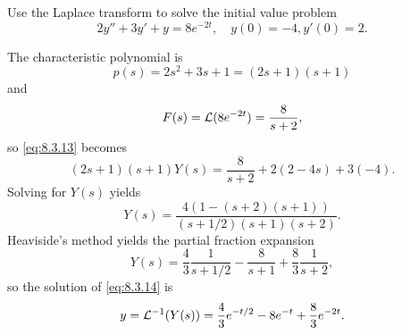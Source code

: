 \documentclass{ximera}
\begin{document}
\begin{example}\label{example:8.3.3}
 Use the Laplace transform to solve the
initial value problem
\begin{equation}\label{eq:8.3.14}
2y''+3y'+y=8e^{-2t}, \quad   y(0)=-4,  y'(0)=2.
\end{equation}

\begin{explanation}
The characteristic polynomial is
$$
p(s)=2s^2+3s+1=(2s+1)(s+1)
$$
 and
$$
F(s)={\cal L}(8e^{-2t})=\frac{8}{s+2},
$$
so \eqref{eq:8.3.13} becomes
$$
(2s+1)(s+1)Y(s)=\frac{8}{s+2}+2(2-4s)+3(-4).
$$
Solving  for $Y(s)$ yields
$$
Y(s)=\frac{4\left(1-(s+2)(s+1)\right)}{(s+1/2)(s+1)(s+2)}.
$$
Heaviside's method yields the partial fraction expansion
$$
Y(s)=\frac{4}{3}\frac{1}{s+1/2}-\frac{8}{s+1}+\frac{8}{3}\frac{1}{s+2},
$$
so the solution of  \eqref{eq:8.3.14} is
$$
y={\cal L}^{-1}(Y(s))=\frac{4}{3}e^{-t/2}-8e^{-t}+\frac{8}{3}e^{-2t}.
$$

\begin{center}
\end{center}

\end{explanation}
\end{example}

\end{document}
